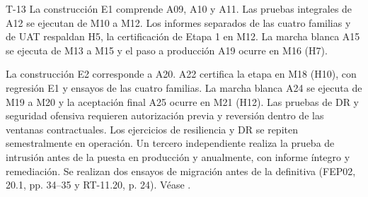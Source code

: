\begin{formulario}{T-13}
La construcción E1 comprende A09, A10 y A11. Las pruebas integrales de A12 se ejecutan de M10 a M12. Los informes separados de las cuatro familias y de UAT respaldan H5, la certificación de Etapa 1 en M12. La marcha blanca A15 se ejecuta de M13 a M15 y el paso a producción A19 ocurre en M16 (H7).

La construcción E2 corresponde a A20. A22 certifica la etapa en M18 (H10), con regresión E1 y ensayos de las cuatro familias. La marcha blanca A24 se ejecuta de M19 a M20 y la aceptación final A25 ocurre en M21 (H12). Las pruebas de DR y seguridad ofensiva requieren autorización previa y reversión dentro de las ventanas contractuales. Los ejercicios de resiliencia y DR se repiten semestralmente en operación. Un tercero independiente realiza la prueba de intrusión antes de la puesta en producción y anualmente, con informe íntegro y remediación. Se realizan dos ensayos de migración antes de la definitiva (FEP02, 20.1, pp. 34--35 y RT-11.20, p. 24). Véase .
\end{formulario}
